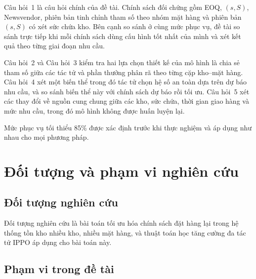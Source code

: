 Câu hỏi~1 là câu hỏi chính của đề tài. Chính sách đối chứng gồm EOQ, $(s, S)$, Newsvendor, phiên bản tinh chỉnh tham số theo nhóm mặt hàng và phiên bản $(s, S)$ có xét sức chứa kho. Bên cạnh so sánh ở cùng mức phục vụ, đề tài so sánh trực tiếp khi mỗi chính sách dùng cấu hình tốt nhất của mình và xét kết quả theo từng giai đoạn nhu cầu.

Câu hỏi~2 và Câu hỏi~3 kiểm tra hai lựa chọn thiết kế của mô hình là chia sẻ tham số giữa các tác tử và phần thưởng phân rã theo từng cặp kho--mặt hàng. Câu hỏi~4 xét một biến thể trong đó tác tử chọn hệ số an toàn dựa trên dự báo nhu cầu, và so sánh biến thể này với chính sách dự báo rồi tối ưu. Câu hỏi~5 xét các thay đổi về nguồn cung chung giữa các kho, sức chứa, thời gian giao hàng và mức nhu cầu, trong đó mô hình không được huấn luyện lại.

Mức phục vụ tối thiểu 85\% được xác định trước khi thực nghiệm và áp dụng như nhau cho mọi phương pháp.

\section{Đối tượng và phạm vi nghiên cứu}
\label{sec:phamvi}

\subsection{Đối tượng nghiên cứu}
\label{subsec:doituong}

Đối tượng nghiên cứu là bài toán tối ưu hóa chính sách đặt hàng lại trong hệ thống tồn kho nhiều kho, nhiều mặt hàng, và thuật toán học tăng cường đa tác tử IPPO áp dụng cho bài toán này.

\subsection{Phạm vi trong đề tài}
\label{subsec:phamvitrong}

